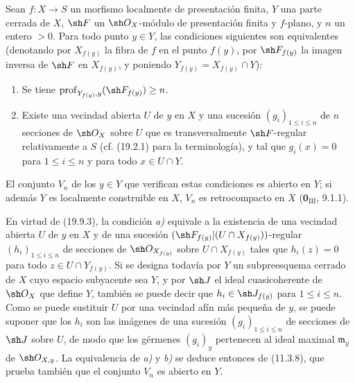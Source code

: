 \begin{proposition}[19.9.6]
\label{IV.19.9.6}
Sean $f:X\to S$ un morfismo localmente de presentación finita, $Y$ una parte
cerrada de $X$, $\sh F$ un $\sh O_X$-módulo de presentación finita y
$f$-plano, y $n$ un entero $>0$. Para todo punto $y\in Y$, las condiciones
siguientes son equivalentes \textup{(}denotando por $X_{f(y)}$ la fibra de $f$ en el
punto $f(y)$, por $\sh F_{f(y)}$ la imagen inversa de $\sh F$ en
$X_{f(y)}$, y poniendo $Y_{f(y)}=X_{f(y)}\cap Y$\textup{)}:
\begin{enumerate}
  \item[\textup{a)}] Se tiene
  $\operatorname{prof}_{Y_{f(y)},y}(\sh F_{f(y)})\geq n$.
  \item[\textup{b)}] Existe una vecindad abierta $U$ de $y$ en $X$ y una sucesión
  $(g_i)_{1\leq i\leq n}$ de $n$ secciones de $\sh O_X$ sobre $U$ que es
  transversalmente $\sh F$-regular relativamente a $S$ \textup{(cf. (19.2.1)} para la
  terminología\textup{)}, y tal que $g_i(x)=0$ para $1\leq i\leq n$ y para todo
  $x\in U\cap Y$.
\end{enumerate}
El conjunto $V_n$ de los $y\in Y$ que verifican estas condiciones es abierto en
$Y$; si además $Y$ es localmente construible en $X$, $V_n$ es
retrocompacto en $X$ \textup{($\mathbf{0}_{\mathrm{III}}$, 9.1.1)}.
\end{proposition}

En virtud de (19.9.3), la condición \emph{a)} equivale a la existencia de una
vecindad abierta $U$ de $y$ en $X$ y de una sucesión
$(\sh F_{f(y)}|(U\cap X_{f(y)}))$-regular $(h_i)_{1\leq i\leq n}$ de secciones
de $\sh O_{X_{f(y)}}$ sobre $U\cap X_{f(y)}$ tales que $h_i(z)=0$ para todo
$z\in U\cap Y_{f(y)}$. Si se designa todavía por $Y$ un subpreesquema cerrado
de $X$ cuyo espacio subyacente sea $Y$, y por $\sh J$ el ideal cuasicoherente
de $\sh O_X$ que define $Y$, también se puede decir que
$h_i\in\sh J_{f(y)}$ para $1\leq i\leq n$. Como se puede sustituir $U$ por una
vecindad afín más pequeña de $y$, se puede suponer que los $h_i$ son las
imágenes de una sucesión $(g_i)_{1\leq i\leq n}$ de secciones de $\sh J$ sobre
$U$, de modo que los gérmenes $(g_i)_y$ pertenecen al ideal maximal
$\mathfrak m_y$ de $\sh O_{X,y}$. La equivalencia de \emph{a)} y \emph{b)} se deduce entonces
de (11.3.8), que prueba también que el conjunto $V_n$ es abierto en $Y$.


